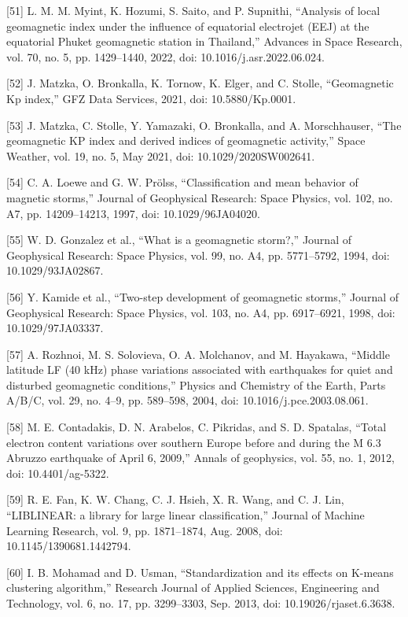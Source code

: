 \let\LaTeXcline\cline\documentclass[sn-mathphys-num]{sn-jnl}\let\cline\LaTeXcline
\begin{document}
[51] L. M. M. Myint, K. Hozumi, S. Saito, and P. Supnithi, “Analysis of local geomagnetic index under the influence of equatorial electrojet (EEJ) at the equatorial Phuket geomagnetic station in Thailand,” Advances in Space Research, vol. 70, no. 5, pp. 1429–1440, 2022, doi: 10.1016/j.asr.2022.06.024.

[52] J. Matzka, O. Bronkalla, K. Tornow, K. Elger, and C. Stolle, “Geomagnetic Kp index,” GFZ Data Services, 2021, doi: 10.5880/Kp.0001.

[53] J. Matzka, C. Stolle, Y. Yamazaki, O. Bronkalla, and A. Morschhauser, “The geomagnetic KP index and derived indices of geomagnetic activity,” Space Weather, vol. 19, no. 5, May 2021, doi: 10.1029/2020SW002641.

[54] C. A. Loewe and G. W. Prölss, “Classification and mean behavior of magnetic storms,” Journal of Geophysical Research: Space Physics, vol. 102, no. A7, pp. 14209–14213, 1997, doi: 10.1029/96JA04020.

[55] W. D. Gonzalez et al., “What is a geomagnetic storm?,” Journal of Geophysical Research: Space Physics, vol. 99, no. A4, pp. 5771–5792, 1994, doi: 10.1029/93JA02867.

[56] Y. Kamide et al., “Two-step development of geomagnetic storms,” Journal of Geophysical Research: Space Physics, vol. 103, no. A4, pp. 6917–6921, 1998, doi: 10.1029/97JA03337.

[57] A. Rozhnoi, M. S. Solovieva, O. A. Molchanov, and M. Hayakawa, “Middle latitude LF (40 kHz) phase variations associated with earthquakes for quiet and disturbed geomagnetic conditions,” Physics and Chemistry of the Earth, Parts A/B/C, vol. 29, no. 4–9, pp. 589–598, 2004, doi: 10.1016/j.pce.2003.08.061.

[58] M. E. Contadakis, D. N. Arabelos, C. Pikridas, and S. D. Spatalas, “Total electron content variations over southern Europe before and during the M 6.3 Abruzzo earthquake of April 6, 2009,” Annals of geophysics, vol. 55, no. 1, 2012, doi: 10.4401/ag-5322.

[59] R. E. Fan, K. W. Chang, C. J. Hsieh, X. R. Wang, and C. J. Lin, “LIBLINEAR: a library for large linear classification,” Journal of Machine Learning Research, vol. 9, pp. 1871–1874, Aug. 2008, doi: 10.1145/1390681.1442794.

[60] I. B. Mohamad and D. Usman, “Standardization and its effects on K-means clustering algorithm,” Research Journal of Applied Sciences, Engineering and Technology, vol. 6, no. 17, pp. 3299–3303, Sep. 2013, doi: 10.19026/rjaset.6.3638.
\end{document}
